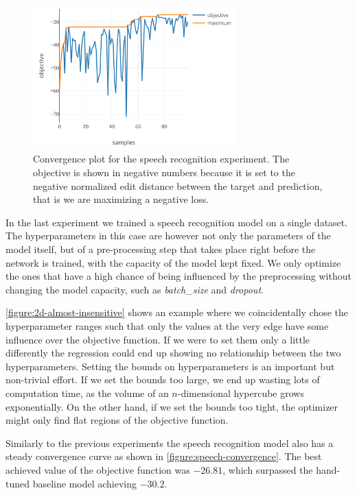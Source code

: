 \begin{figure}
	\begin{center}
		\includegraphics[width=0.7\textwidth]{images/speech-convergence.png}
		\caption{Convergence plot for the speech recognition experiment. The objective is shown in negative numbers because it is set to the negative normalized edit distance between the target and prediction, that is we are maximizing a negative loss.}
		\label{figure:speech-convergence}
	\end{center}
\end{figure}

In the last experiment we trained a speech recognition model on a single
dataset. The hyperparameters in this case are however not only the parameters
of the model itself, but of a pre-processing step that takes place right before
the network is trained, with the capacity of the model kept fixed. We only
optimize the ones that have a high chance of being influenced by the
preprocessing without changing the model capacity, such as \emph{batch\_size}
and \emph{dropout}.

\autoref{figure:2d-almost-insensitive} shows an example where we coincidentally
chose the hyperparameter ranges such that only the values at the very edge have
some influence over the objective function. If we were to set them only a
little differently the regression could end up showing no relationship between
the two hyperparameters. Setting the bounds on hyperparameters is an important
but non-trivial effort. If we set the bounds too large, we end up wasting lots
of computation time, as the volume of an $n$-dimensional hypercube grows
exponentially. On the other hand, if we set the bounds too tight, the optimizer
might only find flat regions of the objective function.

Similarly to the previous experiments the speech recognition model also has a
steady convergence curve as shown in \autoref{figure:speech-convergence}. The
best achieved value of the objective function was $-26.81$, which surpassed the
hand-tuned baseline model achieving $-30.2$.



